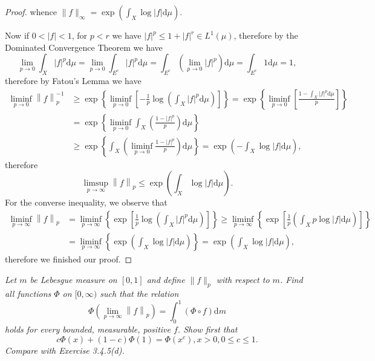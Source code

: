 \begin{proof}
whence $\|f\|_\infty=\exp\left(\int_X\log|f|\mathrm{d}\mu\right)$.\par
Now if $0<|f|<1$, for $p<r$ we have $\left| f \right|^p\le 1+\left| f \right|^r\in L^1\left( \mu \right) $, therefore by the Dominated Convergence Theorem we have 
$$
\lim_{p\rightarrow 0} \int_X{\left| f \right|^p\mathrm{d}\mu}=\lim_{p\rightarrow 0} \int_{E^c}{\left| f \right|^p\mathrm{d}\mu}=\int_{E^c}{\left( \lim_{p\rightarrow 0} \left| f \right|^p \right) \mathrm{d}\mu}=\int_{E^c}{1\mathrm{d}\mu}=1,
$$
therefore by Fatou's Lemma we have 
$$
\begin{aligned}
\mathop {\lim\mathrm{inf}} \limits_{p\rightarrow 0}\left\| f \right\| _{p}^{-1}&\ge \exp \left\{ \mathop {\lim\mathrm{inf}} \limits_{p\rightarrow 0}\left[ -\frac{1}{p}\log \left( \int_X{\left| f \right|^p\mathrm{d}\mu} \right) \right] \right\} =\exp \left\{ \mathop {\lim\mathrm{inf}} \limits_{p\rightarrow 0}\left[ \frac{1-\int_X{\left| f \right|^p\mathrm{d}\mu}}{p} \right] \right\} 
\\
&=\exp \left\{ \mathop {\lim\mathrm{inf}} \limits_{p\rightarrow 0}\int_X{\left( \frac{1-\left| f \right|^p}{p} \right) \mathrm{d}\mu} \right\} 
\\
&\ge \exp \left\{ \int_X{\left( \mathop {\lim\mathrm{inf}} \limits_{p\rightarrow 0}\frac{1-\left| f \right|^p}{p} \right) \mathrm{d}\mu} \right\} =\exp \left( -\int_X{\log \left| f \right|\mathrm{d}\mu} \right) ,
\end{aligned}
$$
therefore 
$$
\mathop {\lim\mathrm{sup}} \limits_{p\rightarrow \infty}\left\| f \right\| _p\le \exp \left( \int_X{\log \left| f \right|\mathrm{d}\mu} \right) .
$$
For the converse inequality, we observe that 
$$
\begin{aligned}
\mathop {\lim\mathrm{inf}} \limits_{p\rightarrow \infty}\left\| f \right\| _p&=\mathop {\lim\mathrm{inf}} \limits_{p\rightarrow \infty}\left\{ \exp \left[ \frac{1}{p}\log \left( \int_X{\left| f \right|^p\mathrm{d}\mu} \right) \right] \right\} \ge \mathop {\lim\mathrm{inf}} \limits_{p\rightarrow \infty}\left\{ \exp \left[ \frac{1}{p}\left( \int_X{p\log \left| f \right|\mathrm{d}\mu} \right) \right] \right\} 
\\
&=\mathop {\lim\mathrm{inf}} \limits_{p\rightarrow \infty}\left\{ \exp \left( \int_X{\log \left| f \right|\mathrm{d}\mu} \right) \right\} =\exp \left( \int_X{\log \left| f \right|\mathrm{d}\mu} \right) ,
\end{aligned}
$$
therefore we finished our proof.
\end{proof}
\begin{problem}\em
Let $m$ be Lebesgue measure on $[0,1]$ and define $\|f\|_p$ with respect to $m$. Find all functions $\Phi$ on $[0,\infty)$ such that the relation 
$$
\Phi \left( \lim_{p\rightarrow \infty} \left\| f \right\| _p \right) =\int_0^1{\left( \Phi \circ f \right) \mathrm{d}m}
$$
holds for every bounded, measurable, positive $f$. Show first that 
$$
c\Phi \left( x \right) +\left( 1-c \right) \Phi \left( 1 \right) =\Phi \left( x^c \right) ,x>0,0\le c\le 1.
$$
Compare with Exercise 3.4.5(d).
\end{problem}
